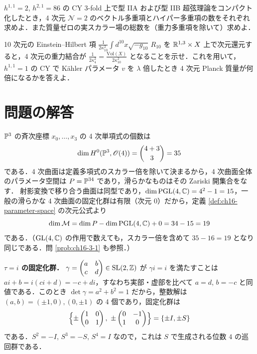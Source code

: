 $h^{1,1}=2$, $h^{2,1}=86$ の CY 3-fold 上で型 IIA および型 IIB 超弦理論をコンパクト化したとき，4 次元 $\mathcal{N}=2$ のベクトル多重項とハイパー多重項の数をそれぞれ求めよ．また質量ゼロの実スカラー場の総数を（重力多重項を除いて）求めよ．

10 次元の Einstein--Hilbert 項 $\frac{1}{2\kappa_{10}^2}\int d^{10}x\sqrt{-g_{10}}\,R_{10}$ を $\mathbb{R}^{1,3}\times X$ 上で次元還元すると，4 次元の重力結合が $\frac{1}{2\kappa_4^2}=\frac{\mathrm{Vol}(X)}{2\kappa_{10}^2}$ となることを示せ．これを用いて，$h^{1,1}=1$ の CY で K\"ahler パラメータ $v$ を $\lambda$ 倍したとき 4 次元 Planck 質量が何倍になるかを答えよ．

\section*{問題の解答}

$\mathbb{P}^3$ の斉次座標 $x_0,\dots,x_3$ の 4 次単項式の個数は
\[
\dim H^0(\mathbb{P}^3,\mathscr{O}(4))=\binom{4+3}{3}=35
\]
である．4 次曲面は定義多項式のスカラー倍を除いて決まるから，4 次曲面全体のパラメータ空間は $P=\mathbb{P}^{34}$ であり，滑らかなものはその Zariski 開集合をなす．
射影変換で移り合う曲面は同型であり，$\dim\operatorname{PGL}(4,\mathbb{C})=4^2-1=15$，一般の滑らかな 4 次曲面の固定化群は有限（次元 $0$）だから，定義 \ref{def:ch16-parameter-space} の次元公式より
\[
\dim\mathcal{M}=\dim P-\dim\operatorname{PGL}(4,\mathbb{C})+0=34-15=19
\]
である．（$\operatorname{GL}(4,\mathbb{C})$ の作用で数えても，スカラー倍を含めて $35-16=19$ となり同じである．問 \ref{prob:ch16-3-1} も参照．）

\textbf{$\tau=i$ の固定化群．}
$\gamma=\begin{pmatrix}a&b\\c&d\end{pmatrix}\in\operatorname{SL}(2,\mathbb{Z})$ が $\gamma i=i$ を満たすことは $ai+b=i(ci+d)=-c+di$，すなわち実部・虚部を比べて $a=d$, $b=-c$ と同値である．このとき $\det\gamma=a^2+b^2=1$ だから，整数解は $(a,b)=(\pm1,0),(0,\pm1)$ の 4 個であり，固定化群は
\[
\Bigl\{\pm\begin{pmatrix}1&0\\0&1\end{pmatrix},\ \pm\begin{pmatrix}0&-1\\1&0\end{pmatrix}\Bigr\}=\{\pm I,\pm S\}
\]
である．$S^2=-I$, $S^3=-S$, $S^4=I$ なので，これは $S$ で生成される位数 $4$ の巡回群である．

